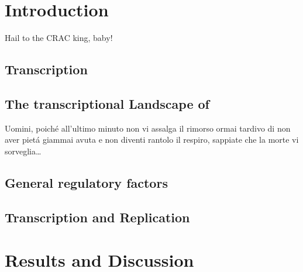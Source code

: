 \documentclass{Thesis}
\begin{document}
\frontmatter

\part{Introduction}

\begin{savequote}[70mm]
Hail to the CRAC king, baby!
\end{savequote}

\chapter{Transcription}
	
	
	
	
\chapter{The transcriptional Landscape of \cer{}}
	
	
\begin{savequote}[70mm]
Uomini, poich\'{e} all'ultimo minuto non vi assalga il rimorso ormai tardivo di non aver piet\'{a} giammai avuta e non diventi rantolo il respiro, sappiate che la morte vi sorveglia\ldots
{} 
\end{savequote}
\chapter{General regulatory factors}
	

\chapter{Transcription and Replication}
	


\part{Results and Discussion}
	
%	
%	




\singlespacing


\end{document}

